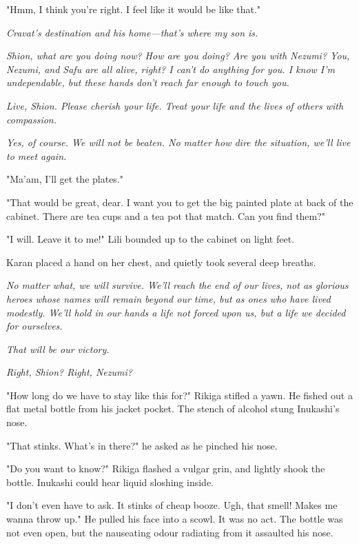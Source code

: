 "Hmm, I think you're right. I feel like it would be like that."

\emph{Cravat's destination and his home---that's where my son is.}

\emph{Shion, what are you doing now? How are you doing? Are you with Nezumi?
You, Nezumi, and Safu are all alive, right? I can't do anything for you.
I know I'm undependable, but these hands don't reach far enough to touch
you.}

\emph{Live, Shion. Please cherish your life. Treat your life and the lives of
others with compassion.}


\emph{Yes, of course. We will not be beaten. No matter how dire the situation,
we'll live to meet again.}

"Ma'am, I'll get the plates."

"That would be great, dear. I want you to get the big painted plate at
back of the cabinet. There are tea cups and a tea pot that match. Can
you find them?"

"I will. Leave it to me!" Lili bounded up to the cabinet on light feet.

Karan placed a hand on her chest, and quietly took several deep breaths.

\emph{No matter what, we will survive. We'll reach the end of our lives, not
as glorious heroes whose names will remain beyond our time, but as ones
who have lived modestly. We'll hold in our hands a life not forced upon
us, but a life we decided for ourselves.}

\emph{That will be our victory.}

\emph{Right, Shion? Right, Nezumi?}

\mybreak

"How long do we have to stay like this for?" Rikiga stifled a yawn. He
fished out a flat metal bottle from his jacket pocket. The stench of
alcohol stung Inukashi's nose.

"That stinks. What's in there?" he asked as he pinched his nose.

"Do you want to know?" Rikiga flashed a vulgar grin, and lightly shook
the bottle. Inukashi could hear liquid sloshing inside.

"I don't even have to ask. It stinks of cheap booze. Ugh, that smell!
Makes me wanna throw up." He pulled his face into a scowl. It was no
act. The bottle was not even open, but the nauseating odour radiating
from it assaulted his nose.

